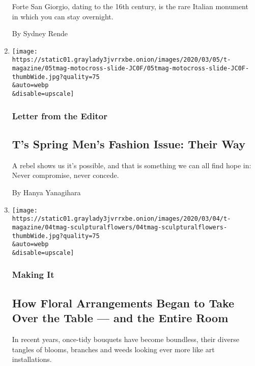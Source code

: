 \begin{enumerate}
  Forte San Giorgio, dating to the 16th century, is the rare Italian
  monument in which you can stay overnight.

  By Sydney Rende
\item
  \href{/2020/03/05/t-magazine/ts-spring-mens-fashion-issue-their-way.html}{}

  \texttt{[image: https://static01.graylady3jvrrxbe.onion/images/2020/03/05/t-magazine/05tmag-motocross-slide-JC0F/05tmag-motocross-slide-JC0F-thumbWide.jpg?quality=75\\\&auto=webp\\\&disable=upscale]}

  \hypertarget{letter-from-the-editor}{%
  \subsubsection{Letter from the Editor}\label{letter-from-the-editor}}

  \hypertarget{ts-spring-mens-fashion-issue-their-way}{%
  \subsection{T's Spring Men's Fashion Issue: Their
  Way}\label{ts-spring-mens-fashion-issue-their-way}}

  A rebel shows us it's possible, and that is something we can all find
  hope in: Never compromise, never concede.

  By Hanya Yanagihara
\item
  \href{/2020/03/04/t-magazine/flower-arrangements-sculptures.html}{}

  \texttt{[image: https://static01.graylady3jvrrxbe.onion/images/2020/03/04/t-magazine/04tmag-sculpturalflowers/04tmag-sculpturalflowers-thumbWide.jpg?quality=75\\\&auto=webp\\\&disable=upscale]}

  \hypertarget{making-it}{%
  \subsubsection{Making It}\label{making-it}}

  \hypertarget{how-floral-arrangements-began-to-take-over-the-table--and-the-entire-room}{%
  \subsection{How Floral Arrangements Began to Take Over the Table ---
  and the Entire
  Room}\label{how-floral-arrangements-began-to-take-over-the-table--and-the-entire-room}}

  In recent years, once-tidy bouquets have become boundless, their
  diverse tangles of blooms, branches and weeds looking ever more like
  art installations.


\end{enumerate}
